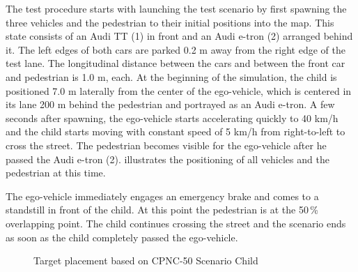 The test procedure starts with launching the test scenario by first spawning the three vehicles and the pedestrian to their initial positions into the map. This state consists of an Audi TT (1) in front and an Audi e-tron (2) arranged behind it. The left edges of both cars are parked 0.2 m away from the right edge of the test lane. The longitudinal distance between the cars and between the front car and pedestrian is 1.0 m, each. At the beginning of the simulation, the child is positioned 7.0 m laterally from the center of the ego-vehicle, which is centered in its lane 200 m behind the pedestrian and portrayed as an Audi e-tron. A few seconds after spawning, the ego-vehicle starts accelerating quickly to 40 km/h and the child starts moving with constant speed of 5 km/h from right-to-left to cross the street. The pedestrian becomes visible for the ego-vehicle after he passed the Audi e-tron (2).  illustrates the positioning of all vehicles and the pedestrian at this time.

The ego-vehicle immediately engages an emergency brake and comes to a standstill in front of the child. At this point the pedestrian is at the 50\,\% overlapping point. The child continues crossing the street and the scenario ends as soon as the child completely passed the ego-vehicle.
\begin{figure}[b]
	\centering
	\caption{Target placement based on CPNC-50 Scenario Child \cite{Protocoll}}
	\label{fig:coordination}
\end{figure}

